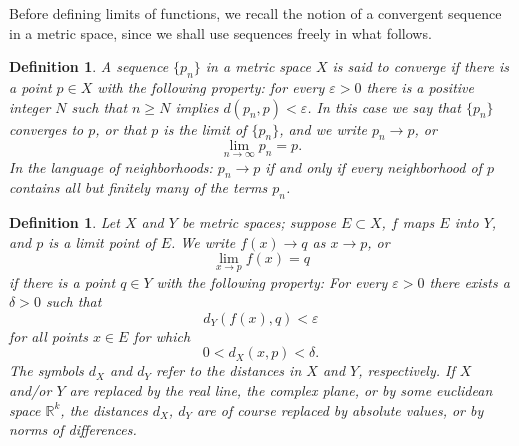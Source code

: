 \documentclass{article}
\theoremstyle{mythm}
\newtheorem{definition}[theorem]{Definition}
\begin{document}
Before defining limits of functions, we recall the notion of a convergent sequence in a metric space, since we shall use sequences freely in what follows.

\begin{definition}\label{def:seq}
A sequence $\{p_n\}$ in a metric space $X$ is said to \textit{converge} if there is a point $p \in X$ with the following property: for every $\varepsilon > 0$ there is a positive integer $N$ such that $n \geq N$ implies $d(p_n, p) < \varepsilon$. In this case we say that $\{p_n\}$ converges to $p$, or that $p$ is the limit of $\{p_n\}$, and we write $p_n \to p$, or
\[
\lim_{n \to \infty} p_n = p.
\]
In the language of neighborhoods: $p_n \to p$ if and only if every neighborhood of $p$ contains all but finitely many of the terms $p_n$.
\end{definition}

\begin{definition}\label{def:limit}
Let $X$ and $Y$ be metric spaces; suppose $E \subset X$, $f$ maps $E$ into $Y$, and $p$ is a limit point of $E$. We write $f(x) \to q$ as $x \to p$, or
\[
\lim_{x \to p} f(x) = q
\]
if there is a point $q \in Y$ with the following property: For every $\varepsilon > 0$ there exists a $\delta > 0$ such that
\[
d_Y(f(x), q) < \varepsilon
\]
for all points $x \in E$ for which
\[
0 < d_X(x, p) < \delta.
\]
The symbols $d_X$ and $d_Y$ refer to the distances in $X$ and $Y$, respectively. If $X$ and/or $Y$ are replaced by the real line, the complex plane, or by some euclidean space $\mathbb{R}^k$, the distances $d_X$, $d_Y$ are of course replaced by absolute values, or by norms of differences.
\end{definition}
\end{document}
